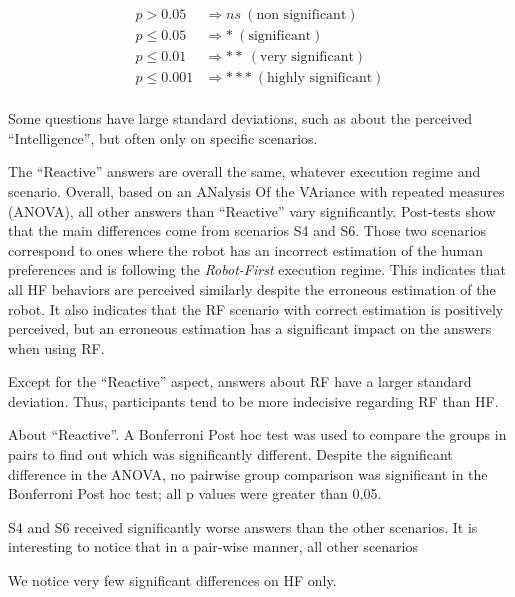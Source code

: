 \begin{align*}
    p > 0.05        & \Rightarrow ns ~ (\textrm{non significant})\\
    p \leq 0.05     & \Rightarrow * ~ (\textrm{significant})\\
    p \leq 0.01     & \Rightarrow ** ~ (\textrm{very significant})\\
    p \leq 0.001    & \Rightarrow *** ~ (\textrm{highly significant})\\
\end{align*}

Some questions have large standard deviations, such as about the perceived ``Intelligence'', but often only on specific scenarios.

The ``Reactive'' answers are overall the same, whatever execution regime and scenario. 
Overall, based on an ANalysis Of the VAriance with repeated measures (ANOVA), all other answers than ``Reactive'' vary significantly. Post-tests show that the main differences come from scenarios S4 and S6. Those two scenarios correspond to ones where the robot has an incorrect estimation of the human preferences and is following the \textit{Robot-First} execution regime. This indicates that all HF behaviors are perceived similarly despite the erroneous estimation of the robot. It also indicates that the RF scenario with correct estimation is positively perceived, but an erroneous estimation has a significant impact on the answers when using RF.  

Except for the ``Reactive'' aspect, answers about RF have a larger standard deviation. Thus, participants tend to be more indecisive regarding RF than HF.

About ``Reactive''. A Bonferroni Post hoc test was used to compare the groups in pairs to find out which was significantly different.
Despite the significant difference in the ANOVA, no pairwise group comparison was significant in the Bonferroni Post hoc test; all p values were greater than 0,05. 

S4 and S6 received significantly worse answers than the other scenarios. It is interesting to notice that in a pair-wise manner, all other scenarios 

We notice very few significant differences on HF only.

